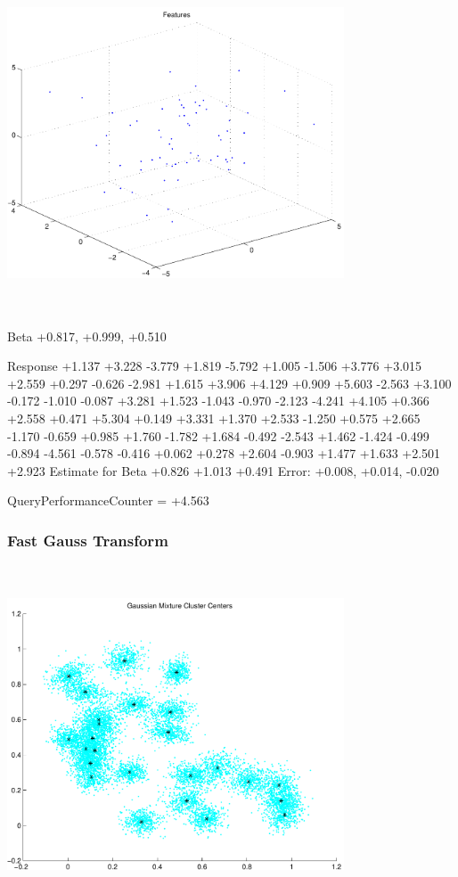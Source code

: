 \documentclass[9pt]{article}
\theoremstyle{plain}
\theoremstyle{definition}
\theoremstyle{remark}
\numberwithin{equation}{section}
\begin{document}
\includegraphics[width=10.0cm,height=10.0cm]{regression_features.pdf}

Beta
+0.817, +0.999, +0.510

Response
+1.137
+3.228
-3.779
+1.819
-5.792
+1.005
-1.506
+3.776
+3.015
+2.559
+0.297
-0.626
-2.981
+1.615
+3.906
+4.129
+0.909
+5.603
-2.563
+3.100
-0.172
-1.010
-0.087
+3.281
+1.523
-1.043
-0.970
-2.123
-4.241
+4.105
+0.366
+2.558
+0.471
+5.304
+0.149
+3.331
+1.370
+2.533
-1.250
+0.575
+2.665
-1.170
-0.659
+0.985
+1.760
-1.782
+1.684
-0.492
-2.543
+1.462
-1.424
-0.499
-0.894
-4.561
-0.578
-0.416
+0.062
+0.278
+2.604
-0.903
+1.477
+1.633
+2.501
+2.923
Estimate for Beta
+0.826
+1.013
+0.491
Error:
+0.008, +0.014, -0.020


QueryPerformanceCounter  =  +4.563
\subsubsection{Fast Gauss Transform}
\includegraphics[width=10.0cm,height=10.0cm]{GaussianMixture_ClusterCenters25_Centers.pdf}
\end{document}
